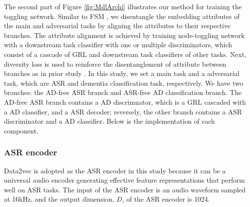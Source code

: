 \documentclass[lettersize,journal]{IEEEtran}
\begin{document}
The second part of Figure \ref{fig:MdlArchi} illustrates our method for training the toggling network. Similar to FSM \cite{huang2022attention}, we disentangle the embedding attributes of the main and adversarial tasks by aligning the attributes to their respective branches. 
The attribute alignment is achieved by training node-toggling network with a downstream task classifier with one or multiple discriminators, which consist of a cascade of GRL and downstream task classifiers of other tasks. Next, diversity loss is used to reinforce the disentanglement of attribute between branches as in prior study \cite{huang2022attention}. In this study, we set a main task and a adversarial task, which are ASR and dementia classification task, respectively. We have two branches: the AD-free ASR branch and ASR-free AD classification branch. The AD-free ASR branch contains a AD discrimnator, which is a GRL cascaded with a AD classifier, and a ASR decoder; reversely, the other branch contains a ASR discriminator and a AD classifier. Below is the implementation of each component. 


\subsubsection{ASR encoder}
\label{ssec:ASRencod}
Data2vec \cite{baevski2022data2vec} is adopted as the ASR encoder in this study because it can be a universal audio encoder generating effective feature representations that perform well on ASR tasks. The input of the ASR encoder is an audio waveform sampled at 16kHz, and the output dimension, $D$, of the ASR encoder is 1024.
\end{document}
